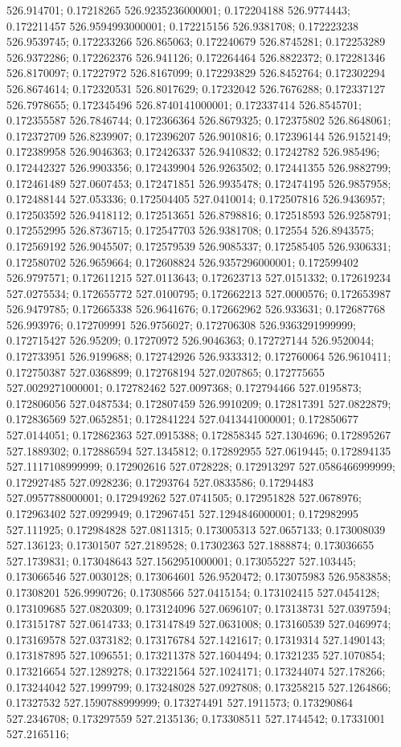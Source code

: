 526.914701; 0.17218265 526.9235236000001; 0.172204188 526.9774443; 0.172211457 526.9594993000001; 0.172215156 526.9381708; 0.172223238 526.9539745; 0.172233266 526.865063; 0.172240679 526.8745281; 0.172253289 526.9372286; 0.172262376 526.941126; 0.172264464 526.8822372; 0.172281346 526.8170097; 0.17227972 526.8167099; 0.172293829 526.8452764; 0.172302294 526.8674614; 0.172320531 526.8017629; 0.17232042 526.7676288; 0.172337127 526.7978655; 0.172345496 526.8740141000001; 0.172337414 526.8545701; 0.172355587 526.7846744; 0.172366364 526.8679325; 0.172375802 526.8648061; 0.172372709 526.8239907; 0.172396207 526.9010816; 0.172396144 526.9152149; 0.172389958 526.9046363; 0.172426337 526.9410832; 0.17242782 526.985496; 0.172442327 526.9903356; 0.172439904 526.9263502; 0.172441355 526.9882799; 0.172461489 527.0607453; 0.172471851 526.9935478; 0.172474195 526.9857958; 0.172488144 527.053336; 0.172504405 527.0410014; 0.172507816 526.9436957; 0.172503592 526.9418112; 0.172513651 526.8798816; 0.172518593 526.9258791; 0.172552995 526.8736715; 0.172547703 526.9381708; 0.172554 526.8943575; 0.172569192 526.9045507; 0.172579539 526.9085337; 0.172585405 526.9306331; 0.172580702 526.9659664; 0.172608824 526.9357296000001; 0.172599402 526.9797571; 0.172611215 527.0113643; 0.172623713 527.0151332; 0.172619234 527.0275534; 0.172655772 527.0100795; 0.172662213 527.0000576; 0.172653987 526.9479785; 0.172665338 526.9641676; 0.172662962 526.933631; 0.172687768 526.993976; 0.172709991 526.9756027; 0.172706308 526.9363291999999; 0.172715427 526.95209; 0.17270972 526.9046363; 0.172727144 526.9520044; 0.172733951 526.9199688; 0.172742926 526.9333312; 0.172760064 526.9610411; 0.172750387 527.0368899; 0.172768194 527.0207865; 0.172775655 527.0029271000001; 0.172782462 527.0097368; 0.172794466 527.0195873; 0.172806056 527.0487534; 0.172807459 526.9910209; 0.172817391 527.0822879; 0.172836569 527.0652851; 0.172841224 527.0413441000001; 0.172850677 527.0144051; 0.172862363 527.0915388; 0.172858345 527.1304696; 0.172895267 527.1889302; 0.172886594 527.1345812; 0.172892955 527.0619445; 0.172894135 527.1117108999999; 0.172902616 527.0728228; 0.172913297 527.0586466999999; 0.172927485 527.0928236; 0.17293764 527.0833586; 0.17294483 527.0957788000001; 0.172949262 527.0741505; 0.172951828 527.0678976; 0.172963402 527.0929949; 0.172967451 527.1294846000001; 0.172982995 527.111925; 0.172984828 527.0811315; 0.173005313 527.0657133; 0.173008039 527.136123; 0.17301507 527.2189528; 0.17302363 527.1888874; 0.173036655 527.1739831; 0.173048643 527.1562951000001; 0.173055227 527.103445; 0.173066546 527.0030128; 0.173064601 526.9520472; 0.173075983 526.9583858; 0.17308201 526.9990726; 0.17308566 527.0415154; 0.173102415 527.0454128; 0.173109685 527.0820309; 0.173124096 527.0696107; 0.173138731 527.0397594; 0.173151787 527.0614733; 0.173147849 527.0631008; 0.173160539 527.0469974; 0.173169578 527.0373182; 0.173176784 527.1421617; 0.17319314 527.1490143; 0.173187895 527.1096551; 0.173211378 527.1604494; 0.17321235 527.1070854; 0.173216654 527.1289278; 0.173221564 527.1024171; 0.173244074 527.178266; 0.173244042 527.1999799; 0.173248028 527.0927808; 0.173258215 527.1264866; 0.17327532 527.1590788999999; 0.173274491 527.1911573; 0.173290864 527.2346708; 0.173297559 527.2135136; 0.173308511 527.1744542; 0.17331001 527.2165116; 
